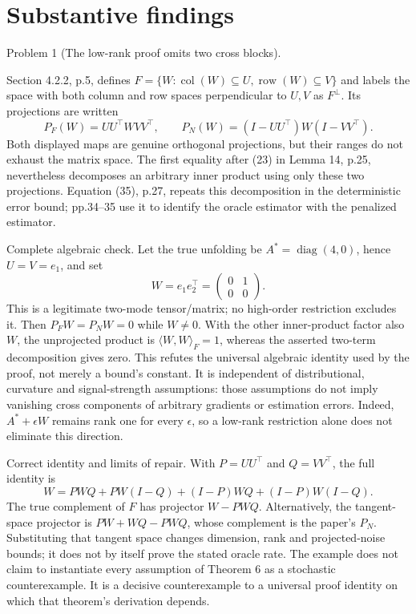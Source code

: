 \documentclass[10pt]{article}
\begin{document}
\section*{Substantive findings}
Problem 1 (The low-rank proof omits two cross blocks).\par
Section 4.2.2, p.5, defines \(F=\{W:\operatorname{col}(W)\subseteq U,\operatorname{row}(W)\subseteq V\}\) and labels the space with both column and row spaces perpendicular to \(U,V\) as \(F^\perp\). Its projections are written \[P_F(W)=UU^\top WVV^\top,\qquad P_N(W)=(I-UU^\top)W(I-VV^\top).\] Both displayed maps are genuine orthogonal projections, but their ranges do not exhaust the matrix space. The first equality after (23) in Lemma 14, p.25, nevertheless decomposes an arbitrary inner product using only these two projections. Equation (35), p.27, repeats this decomposition in the deterministic error bound; pp.34–35 use it to identify the oracle estimator with the penalized estimator.\par
Complete algebraic check. Let the true unfolding be \(A^*=\operatorname{diag}(4,0)\), hence \(U=V=e_1\), and set \[W=e_1e_2^\top=\begin{pmatrix}0&1\\0&0\end{pmatrix}.\] This is a legitimate two-mode tensor/matrix; no high-order restriction excludes it. Then \(P_FW=P_NW=0\) while \(W\ne0\). With the other inner-product factor also \(W\), the unprojected product is \(\langle W,W\rangle_F=1\), whereas the asserted two-term decomposition gives zero. This refutes the universal algebraic identity used by the proof, not merely a bound’s constant. It is independent of distributional, curvature and signal-strength assumptions: those assumptions do not imply vanishing cross components of arbitrary gradients or estimation errors. Indeed, \(A^*+\epsilon W\) remains rank one for every \(\epsilon\), so a low-rank restriction alone does not eliminate this direction.\par
Correct identity and limits of repair. With \(P=UU^\top\) and \(Q=VV^\top\), the full identity is \[W=PWQ+PW(I-Q)+(I-P)WQ+(I-P)W(I-Q).\] The true complement of \(F\) has projector \(W-PWQ\). Alternatively, the tangent-space projector is \(PW+WQ-PWQ\), whose complement is the paper’s \(P_N\). Substituting that tangent space changes dimension, rank and projected-noise bounds; it does not by itself prove the stated oracle rate. The example does not claim to instantiate every assumption of Theorem 6 as a stochastic counterexample. It is a decisive counterexample to a universal proof identity on which that theorem’s derivation depends.\par
\end{document}

